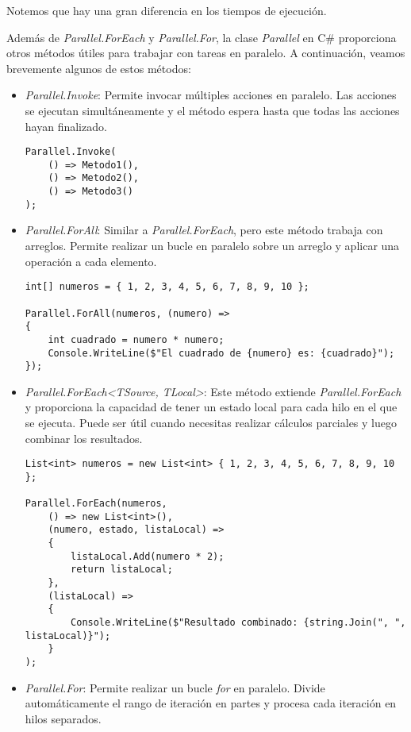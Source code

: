 \documentclass[executivepaper]{article}
\begin{document}
Notemos que hay una gran diferencia en los tiempos de ejecución.

Además de \emph{Parallel.ForEach} y \emph{Parallel.For}, la clase \emph{Parallel} en C\# proporciona otros métodos útiles para trabajar con tareas en paralelo. A continuación, veamos brevemente algunos de estos métodos:

\begin{itemize}
    \item \emph{Parallel.Invoke}: Permite invocar múltiples acciones en paralelo. Las acciones se ejecutan simultáneamente y el método espera hasta que todas las acciones hayan finalizado.
    
\begin{lstlisting}
Parallel.Invoke(
    () => Metodo1(),
    () => Metodo2(),
    () => Metodo3()
);
\end{lstlisting}

    \item \emph{Parallel.ForAll}: Similar a \emph{Parallel.ForEach}, pero este método trabaja con arreglos. Permite realizar un bucle en paralelo sobre un arreglo y aplicar una operación a cada elemento.
    
\begin{lstlisting}
int[] numeros = { 1, 2, 3, 4, 5, 6, 7, 8, 9, 10 };

Parallel.ForAll(numeros, (numero) =>
{
    int cuadrado = numero * numero;
    Console.WriteLine($"El cuadrado de {numero} es: {cuadrado}");
});
\end{lstlisting}

    \item \emph{Parallel.ForEach<TSource, TLocal>}: Este método extiende \emph{Parallel.ForEach} y proporciona la capacidad de tener un estado local para cada hilo en el que se ejecuta. Puede ser útil cuando necesitas realizar cálculos parciales y luego combinar los resultados.
    
\begin{lstlisting}
List<int> numeros = new List<int> { 1, 2, 3, 4, 5, 6, 7, 8, 9, 10 };

Parallel.ForEach(numeros,
    () => new List<int>(),
    (numero, estado, listaLocal) =>
    {
        listaLocal.Add(numero * 2);
        return listaLocal;
    },
    (listaLocal) =>
    {
        Console.WriteLine($"Resultado combinado: {string.Join(", ", listaLocal)}");
    }
);
\end{lstlisting}

    \item \emph{Parallel.For}: Permite realizar un bucle \emph{for} en paralelo. Divide automáticamente el rango de iteración en partes y procesa cada iteración en hilos separados.
    

\end{itemize}
\end{document}
